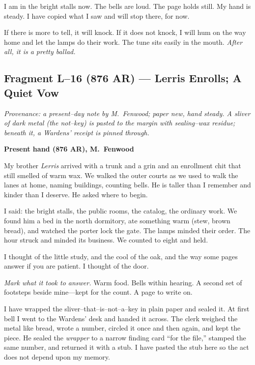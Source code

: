 \documentclass[11pt]{article}
\begin{document}
I am in the bright stalls now. The bells are loud. The page holds still. My hand is steady. I have copied what I saw and will stop there, for now.

If there is more to tell, it will knock. If it does not knock, I will hum on the way home and let the lamps do their work. The tune sits easily in the mouth. \emph{After all, it is a pretty ballad.}

\subsection{Fragment L--16 (876 AR) — Lerris Enrolls; A Quiet Vow}
\label{frag:l16}

\noindent\textit{Provenance: a present–day note by M.\ Fenwood; paper new, hand steady. A sliver of dark metal (the not–key) is pasted to the margin with sealing–wax residue; beneath it, a Wardens’ receipt is pinned through.}

\medskip
\noindent\textbf{Present hand (876 AR), M.\ Fenwood}

My brother \textit{Lerris} arrived with a trunk and a grin and an enrollment chit that still smelled of warm wax. We walked the outer courts as we used to walk the lanes at home, naming buildings, counting bells. He is taller than I remember and kinder than I deserve. He asked where to begin.

I said: the bright stalls, the public rooms, the catalog, the ordinary work. We found him a bed in the north dormitory, ate something warm (stew, brown bread), and watched the porter lock the gate. The lamps minded their order. The hour struck and minded its business. We counted to eight and held.

I thought of the little study, and the cool of the oak, and the way some pages answer if you are patient. I thought of the door.

\medskip
\noindent\textit{Mark what it took to answer.} Warm food. Bells within hearing. A second set of footsteps beside mine—kept for the count. A page to write on.

I have wrapped the sliver–that–is–not–a–key in plain paper and sealed it. At first bell I went to the Wardens’ desk and handed it across. The clerk weighed the metal like bread, wrote a number, circled it once and then again, and kept the piece. He sealed the \emph{wrapper} to a narrow finding card “for the file,” stamped the same number, and returned it with a stub. I have pasted the stub here so the act does not depend upon my memory.
\end{document}
